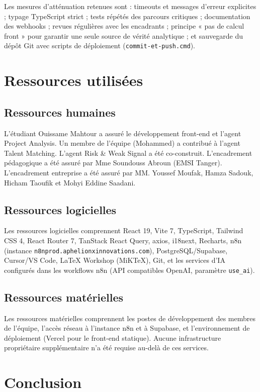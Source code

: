 Les mesures d'atténuation retenues sont : timeouts et messages d'erreur explicites ; typage TypeScript strict ; tests répétés des parcours critiques ; documentation des webhooks ; revues régulières avec les encadrants ; principe « pas de calcul front » pour garantir une seule source de vérité analytique ; et sauvegarde du dépôt Git avec scripts de déploiement (\texttt{commit-et-push.cmd}).

\section{Ressources utilisées}

\subsection{Ressources humaines}

L'étudiant Ouissame Mahtour a assuré le développement front-end et l'agent Project Analysis. Un membre de l'équipe (Mohammed) a contribué à l'agent Talent Matching. L'agent Risk \& Weak Signal a été co-construit. L'encadrement pédagogique a été assuré par Mme Soundouss Abroun (EMSI Tanger). L'encadrement entreprise a été assuré par MM. Youssef Moufak, Hamza Sadouk, Hicham Taoufik et Mohyi Eddine Saadani.

\subsection{Ressources logicielles}

Les ressources logicielles comprennent React 19, Vite 7, TypeScript, Tailwind CSS 4, React Router 7, TanStack React Query, axios, i18next, Recharts, n8n (instance \texttt{n8nprod.aphelionxinnovations.com}), PostgreSQL/Supabase, Cursor/VS Code, LaTeX Workshop (MiKTeX), Git, et les services d'IA configurés dans les workflows n8n (API compatibles OpenAI, paramètre \texttt{use\_ai}).

\subsection{Ressources matérielles}

Les ressources matérielles comprennent les postes de développement des membres de l'équipe, l'accès réseau à l'instance n8n et à Supabase, et l'environnement de déploiement (Vercel pour le front-end statique). Aucune infrastructure propriétaire supplémentaire n'a été requise au-delà de ces services.

\section{Conclusion}

